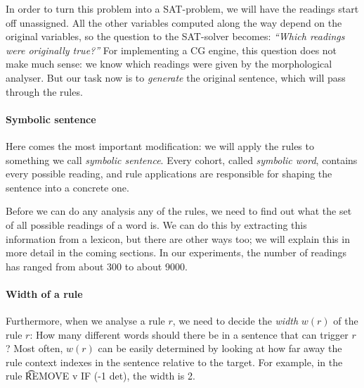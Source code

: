 In order to turn this problem into a SAT-problem, we will have the readings start off
unassigned. All the other variables computed along the way depend on the original variables, so the question to the SAT-solver becomes: \emph{``Which readings were originally true?''}
For implementing a CG engine, this question does not make much sense: we know which readings were given by the morphological analyser. 
But our task now is to {\em generate} the original sentence, which
will pass through the rules. 

\paragraph{Symbolic sentence}

Here comes the most important modification: we will apply the rules to
something we call {\em symbolic sentence}.  Every cohort, called {\em
symbolic word}, contains every possible reading, and rule applications
are responsible for shaping the sentence into a concrete one.


Before we can do any analysis any of the rules, we need to find out
what the set of all possible readings of a word is. We can do this by
extracting this information from a lexicon, but there are other ways
too; we will explain this in more detail in the coming sections. In
our experiments, the number of readings has ranged from about 300 to
about 9000.


\paragraph{Width of a rule}
Furthermore, when we analyse a rule $r$, we need to decide the {\em
width} $w(r)$ of the rule $r$: How many different words should there
be in a sentence that can trigger $r$? Most often, $w(r)$ can be
easily determined by looking at how far away the rule context indexes
in the sentence relative to the target. For example, in the
rule \t{REMOVE v IF (-1 det)}, the width is 2.

